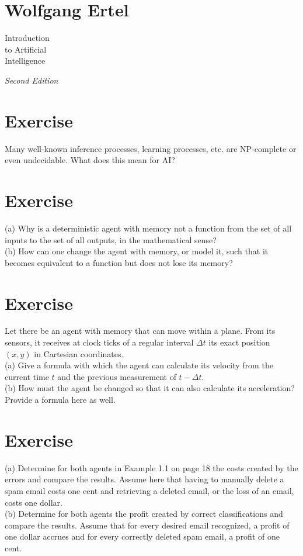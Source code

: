 \documentclass[10pt]{book}
\begin{document}
\tableofcontents

\section{Wolfgang Ertel}
\begin{center}
Introduction \\
to Artificial \\
Intelligence
\end{center}

\textit{Second Edition}

\tableofcontents

\section{Exercise}
Many well-known inference processes, learning processes, etc. are NP-complete or even undecidable. What does this mean for AI?

\section{Exercise}
(a) Why is a deterministic agent with memory not a function from the set of all inputs to the set of all outputs, in the mathematical sense?\\
(b) How can one change the agent with memory, or model it, such that it becomes equivalent to a function but does not lose its memory?\\

\section{Exercise}
Let there be an agent with memory that can move within a plane. From its sensors, it receives at clock ticks of a regular interval $\Delta t$ its exact position $(x, y)$ in Cartesian coordinates.\\
(a) Give a formula with which the agent can calculate its velocity from the current time $t$ and the previous measurement of $t-\Delta t$.\\
(b) How must the agent be changed so that it can also calculate its acceleration? Provide a formula here as well.

\section{Exercise}
(a) Determine for both agents in Example 1.1 on page 18 the costs created by the errors and compare the results. Assume here that having to manually delete a spam email costs one cent and retrieving a deleted email, or the loss of an email, costs one dollar.\\
(b) Determine for both agents the profit created by correct classifications and compare the results. Assume that for every desired email recognized, a profit of one dollar accrues and for every correctly deleted spam email, a profit of one cent.
\end{document}
